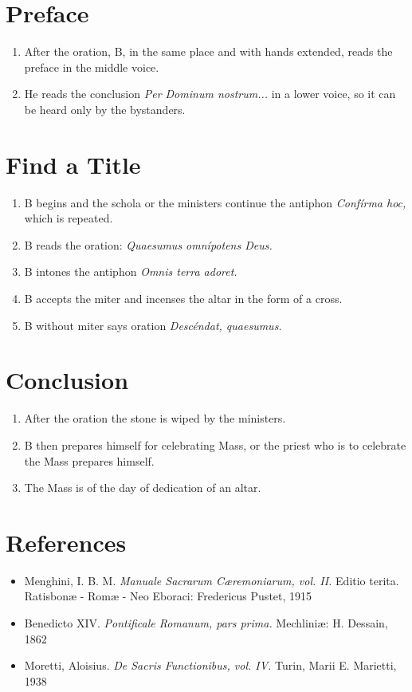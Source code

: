 \documentclass[twocolumn]{report}
\begin{document}
\section*{Preface}
\begin{enumerate}
	\item After the oration, B, in the same place and with hands extended, reads the preface in the middle voice.
	\item He reads the conclusion \textit{Per Dominum nostrum...} in a lower voice, so it can be heard only by the bystanders.
\end{enumerate}
\section*{Find a Title}
\begin{enumerate}
	\item B begins and the schola or the ministers continue the antiphon \textit{Confírma hoc,} which is repeated.
	\item B reads the oration: \textit{Quaesumus omnípotens Deus.}
	\item B intones the antiphon \textit{Omnis terra adoret.}
	\item B accepts the miter and incenses the altar in the form of a cross.
	\item B without miter says oration \textit{Descéndat, quaesumus.}
\end{enumerate}
\section*{Conclusion}
\begin{enumerate}
	\item After the oration the stone is wiped by the ministers.
	\item B then prepares himself for celebrating Mass, or the priest who is to celebrate the Mass prepares himself.
	\item The Mass is of the day of dedication of an altar.
\end{enumerate}
\section*{References}
\begin{itemize}
	\item Menghini, I. B. M. \textit{Manuale Sacrarum Cæremoniarum, vol. II.} Editio terita. Ratisbonæ - Romæ - Neo Eboraci: Fredericus Pustet, 1915
	\item Benedicto XIV. \textit{Pontificale Romanum, pars prima.} Mechliniæ: H. Dessain, 1862
	\item Moretti, Aloisius. \textit{De Sacris Functionibus, vol. IV.} Turin, Marii E. Marietti, 1938
\end{itemize}
\end{document}
